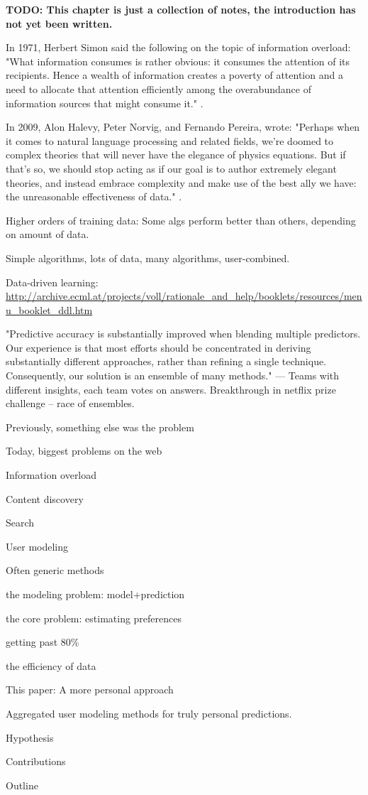 \textbf{TODO: This chapter is just a collection of notes,
the introduction has not yet been written.}

In 1971, Herbert Simon said the following on the topic of information overload: 
"What information consumes is rather obvious: it consumes the attention of its recipients. 
Hence a wealth of information creates a poverty of attention and 
a need to allocate that attention efficiently among the overabundance of 
information sources that might consume it." \cite{Greenberger1971}.


In 2009, Alon Halevy, Peter Norvig, and Fernando Pereira, wrote:
"Perhaps when it comes to natural language processing and related fields, 
we’re doomed to complex theories that will never have the elegance of physics equations. 
But if that’s so, we should stop acting as if our goal is to author extremely elegant theories, 
and instead embrace complexity and make use of the best ally we have: 
the unreasonable effectiveness of data."
\cite{Halevy2009}.

Higher orders of training data:
Some algs perform better than others, depending on amount of data.
\cite{Banko2001}

Simple algorithms, lots of data, many algorithms, user-combined.

Data-driven learning:
\url{http://archive.ecml.at/projects/voll/rationale_and_help/booklets/resources/menu_booklet_ddl.htm}

"Predictive accuracy is substantially improved when blending multiple predictors. 
Our experience is that most efforts should be concentrated in deriving substantially 
different approaches, rather than refining a single technique. 
Consequently, our solution is an ensemble of many methods."
--- \cite{Bell2007}
Teams with different insights, each team votes on answers.
Breakthrough in netflix prize challenge -- race of ensembles.


Previously, something else was the problem

Today, biggest problems on the web

Information overload

Content discovery

Search

User modeling

Often generic methods

the modeling problem: model+prediction

the core problem: estimating preferences

getting past 80\%

the efficiency of data

This paper: A more personal approach

Aggregated user modeling methods for 
truly personal predictions.

Hypothesis

Contributions

Outline


